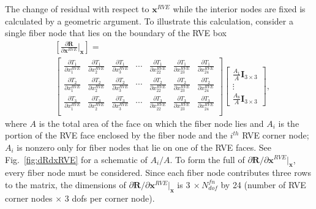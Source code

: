 The change of residual with respect to $\pmb{x}^{RVE}$ while the interior nodes are fixed is calculated by a geometric argument. To illustrate this calculation, consider a single fiber node that lies on the boundary of the RVE box 
%
\begin{align}
&\left [\frac{\partial \pmb{R}}{\partial \pmb{x}^{RVE}}\bigg |_{\pmb{x}}\right] = \nonumber\\
%
&\begin{bmatrix} 
\frac{\partial T_1}{\partial x_1^{RVE}} & \frac{\partial T_1}{\partial x_2^{RVE}} & \frac{\partial T_1}{\partial x_3^{RVE}} & \cdots & \frac{\partial T_1}{\partial x_{22}^{RVE}} & \frac{\partial T_1}{\partial x_{23}^{RVE}} & \frac{\partial T_1}{\partial x_{24}^{RVE}} \\
%
\frac{\partial T_2}{\partial x_1^{RVE}} & \frac{\partial T_2}{\partial x_2^{RVE}} & \frac{\partial T_2}{\partial x_3^{RVE}} & \cdots & \frac{\partial T_2}{\partial x_{22}^{RVE}} & \frac{\partial T_2}{\partial x_{23}^{RVE}} & \frac{\partial T_2}{\partial x_{24}^{RVE}} \\
%
\frac{\partial T_3}{\partial x_1^{RVE}} & \frac{\partial T_3}{\partial x_2^{RVE}} & \frac{\partial T_3}{\partial x_3^{RVE}} & \cdots & \frac{\partial T_3}{\partial x_{22}^{RVE}} & \frac{\partial T_3}{\partial x_{23}^{RVE}} & \frac{\partial T_3}{\partial x_{24}^{RVE}} \\
\end{bmatrix} \begin{bmatrix}
\frac{A_1}{A}\pmb{I}_{3\times3} \\ \vdots \\ \frac{A_8}{A}\pmb{I}_{3\times3}
\end{bmatrix},
\label{eq:dRdxRVE_1node}
\end{align}
%
where $A$ is the total area of the face on which the fiber node lies and $A_i$ is the portion of the RVE face enclosed by the fiber node and the $i^{th}$ RVE corner node; $A_i$ is nonzero only for fiber nodes that lie on one of the RVE faces. See Fig.\ \ref{fig:dRdxRVE} for a schematic of $A_i/A$. To form the full of $\partial \pmb{R}/\partial \pmb{x}^{RVE} |_{\pmb{x}}$, every fiber node must be considered. Since each fiber node contributes three rows to the matrix, the dimensions of $\partial \pmb{R}/\partial \pmb{x}^{RVE} |_{\pmb{x}}$ is $3 \ \times N_{dof}^{fn}$ by 24 (number of RVE corner nodes $\times$ 3 dofs per corner node).
%
